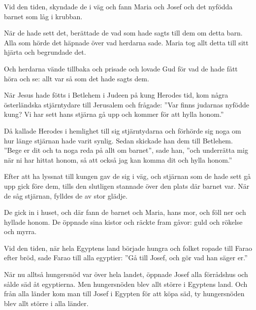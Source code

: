 {Vid den tiden, skyndade de i väg och fann Maria och Josef och det nyfödda barnet som låg i krubban. 

När de hade sett det, berättade de vad som hade sagts till dem om detta barn. 
Alla som hörde det häpnade över vad herdarna sade. 
Maria tog allt detta till sitt hjärta och begrundade det. 

Och herdarna vände tillbaka och prisade och lovade Gud för vad de hade fått höra och se: allt var så som det hade sagts dem.}

	

{När Jesus hade fötts i Betlehem i Judeen på kung Herodes tid, kom några österländska stjärntydare till Jerusalem 
och frågade: ”Var finns judarnas nyfödde kung? Vi har sett hans stjärna gå upp och kommer för att hylla honom.” 

Då kallade Herodes i hemlighet till sig stjärntydarna och förhörde sig noga om hur länge stjärnan hade varit synlig. 
Sedan skickade han dem till Betlehem. ”Bege er dit och ta noga reda på allt om barnet”, sade han, ”och underrätta mig när ni har hittat honom, så att också jag kan komma dit och hylla honom.” 

Efter att ha lyssnat till kungen gav de sig i väg, och stjärnan som de hade sett gå upp gick före dem, tills den slutligen stannade över den plats där barnet var. 
När de såg stjärnan, fylldes de av stor glädje. 

De gick in i huset, och där fann de barnet och Maria, hans mor, och föll ner och hyllade honom. De öppnade sina kistor och räckte fram gåvor: guld och rökelse och myrra.}


{Vid den tiden, när hela Egyptens land började hungra och folket ropade till Farao efter bröd, sade Farao till alla egyptier: ”Gå till Josef, och gör vad han säger er.” 

När nu alltså hungersnöd var över hela landet, öppnade Josef alla förrådshus och sålde säd åt egyptierna. Men hungersnöden blev allt större i Egyptens land. 
Och från alla länder kom man till Josef i Egypten för att köpa säd, ty hungersnöden blev allt större i alla länder.}



